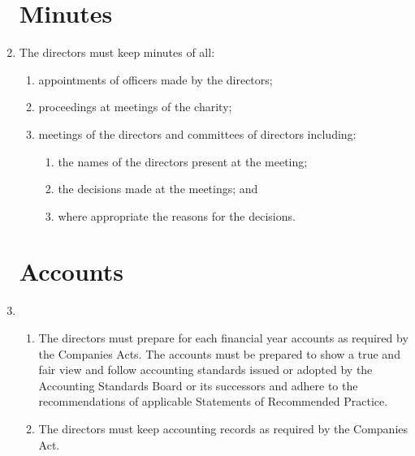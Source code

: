 \documentclass{article}
\begin{document}
\begin{enumerate}[label=\arabic*, start=23]
    \section{Minutes}
    \item The directors must keep minutes of all:
    \begin{enumerate}[label=(\arabic*)]
        \item appointments of officers made by the directors;
        \item proceedings at meetings of the charity;
        \item meetings of the directors and committees of directors including:
        \begin{enumerate}[label=(\alph*)]
            \item the names of the directors present at the meeting;
            \item the decisions made at the meetings; and
            \item where appropriate the reasons for the decisions.
        \end{enumerate}
    \end{enumerate}
    
    \section{Accounts}
    \item \begin{enumerate}[label=(\arabic*)]
        \item The directors must prepare for each financial year accounts as
        required by the Companies Acts. The accounts must be prepared
        to show a true and fair view and follow accounting standards
        issued or adopted by the Accounting Standards Board or its
        successors and adhere to the recommendations of applicable
        Statements of Recommended Practice.
        \item The directors must keep accounting records as required by the
        Companies Act.
    \end{enumerate}
    

\end{enumerate}
\end{document}
